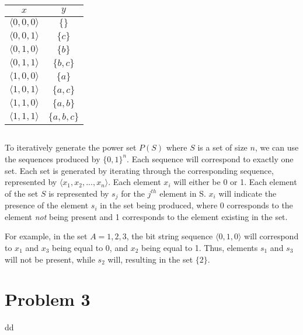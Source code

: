 \documentclass[titlepage]{article}
\begin{document}
\begin{center}
\begin{tabular}{c|c}
\textbf{$x$} & \textbf{$y$} \\ \hline
\(\langle0,0,0\rangle\) & \(\{ \}\) \\
\(\langle0,0,1\rangle\) & \(\{c\}\) \\
\(\langle0,1,0\rangle\) & \(\{b\}\) \\
\(\langle0,1,1\rangle\) & \(\{b,c\}\) \\
\(\langle1,0,0\rangle\) & \(\{a\}\) \\
\(\langle1,0,1\rangle\) & \(\{a,c\}\) \\
\(\langle1,1,0\rangle\) & \(\{a,b\}\) \\
\(\langle1,1,1\rangle\) & \(\{a,b,c\}\) \\
\end{tabular}
\end{center}

\subsection{}

To iteratively generate the power set $P(S)$ where $S$ is a set of size $n$, we can use the sequences produced by $\{0,1\}^n$. Each sequence will correspond to exactly one set. Each set is generated by iterating through the corresponding sequence, represented by \(\langle x_1,x_2,...,x_n\rangle\). Each element $x_i$ will either be 0 or 1. Each element of the set $S$ is represented by $s_j$ for the $j^{th}$ element in S. $x_i$ will indicate the presence of the element $s_i$ in the set being produced, where 0 corresponds to the element \textit{not} being present and 1 corresponds to the element existing in the set. 

For example, in the set $A = {1,2,3}$, the bit string sequence \(\langle0,1,0\rangle\) will correspond to $x_1$ and $x_3$ being equal to 0, and $x_2$ being equal to 1. Thus, elements $s_1$ and $s_3$ will not be present, while $s_2$ will, resulting in the set \(\{2\}\).

\section{Problem 3}dd

\subsection{}
\end{document}

